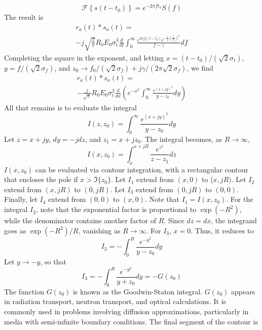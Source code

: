 \documentclass[amsmath,amssymb,aps,prd,10pt,twocolumn,showkeys]{revtex4}
\begin{document}
\begin{itemize}
\begin{equation}
\mathcal{F}\left\lbrace s(t-t_0)\right\rbrace = e^{-2\pi f t_0} S(f)
\end{equation}
The result is
\begin{multline}
r_a(t) * s_a(t) = \\ -j \sqrt{\frac{2}{\pi}} R_0 E_0 \sigma_t^3 \frac{d}{dt} \int_0^\infty \frac{e^{2\pi j f(t-t_0)} e^{-\frac{1}{2}\left(\frac{f}{\sigma_f}\right)^2}}{f-z}df
\end{multline}
Completing the square in the exponent, and letting $x = (t-t_0)/(\sqrt{2}\sigma_t)$, $y = f/(\sqrt{2}\sigma_f)$, and $z_0 \to f_0/(\sqrt{2}\sigma_f)+j \gamma/(2\pi\sqrt{2}\sigma_f)$, we find
\begin{multline}
r_a(t) * s_a(t) = \\ -\frac{j}{\sqrt{\pi}} R_0 E_0 \sigma_t^2 \frac{d}{dx} \left(e^{-x^2} \int_0^{\infty} \frac{e^{(x+jy)^2}}{y-z_0} dy \right) \label{eq:withI}
\end{multline}
All that remains is to evaluate the integral
\begin{equation}
I(z,z_0) = \int_0^{\infty} \frac{e^{(x+jy)^2}}{y-z_0} dy
\end{equation}
Let $z = x+jy$, $dy = -jdz$, and $z_1 = x+jz_0$.  The integral becomes, as $R \to \infty$,
\begin{equation}
I(x,z_0) = \int_{x}^{x+jR} \frac{e^{z^2}}{z - z_1} dz
\end{equation}
$I(x,z_0)$ can be evaluated via contour integration, with a rectangular contour that encloses the pole if $x > \Im\lbrace z_0\rbrace$.  Let $I_1$ extend from $(x,0)$ to ($x,jR)$.  Let $I_2$ extend from $(x,jR)$ to $(0,jR)$.  Let $I_3$ extend from $(0,jR)$ to $(0,0)$.  Finally, let $I_4$ extend from $(0,0)$ to $(x,0)$.  Note that $I_1 = I(x,z_0)$.  For the integral $I_2$, note that the exponential factor is proportional to $\exp(-R^2)$, while the denominator contains another factor of $R$.  Since $dz = dx$, the integrand goes as $\exp(-R^2)/R$, vanishing as $R \to \infty$.  For $I_3$, $x=0$.  Thus, it reduces to
\begin{equation}
I_3 = - \int_{0}^{R} \frac{e^{-y^2}}{y-z_0} dy
\end{equation}
Let $y \to -y$, so that 
\begin{equation}
I_3 = - \int_{0}^{R} \frac{e^{-y^2}}{y+z_0} dy = -G(z_0)
\end{equation}
The function $G(z_0)$ is known as the Goodwin-Staton integral.  $G(z_0)$ appears in radiation transport, neutron transport, and optical calculations.  It is commonly used in problems involving diffusion approximations, particularly in media with semi-infinite boundary conditions.  The final segment of the contour is

\end{itemize}
\end{document}
